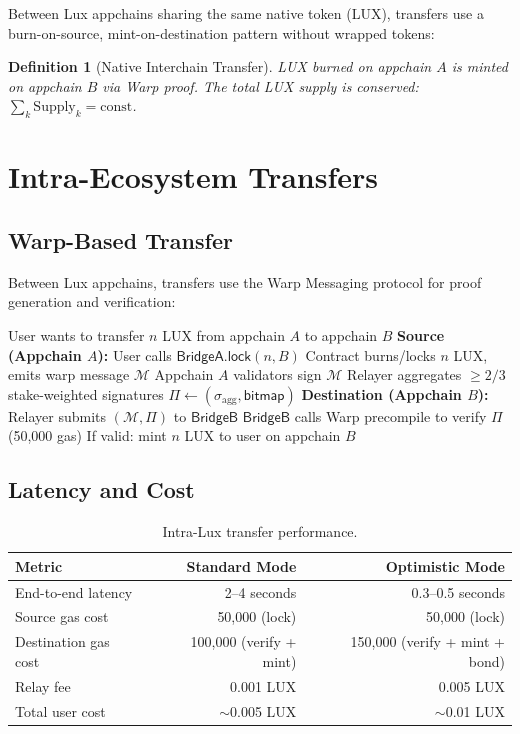 \documentclass[11pt,a4paper]{article}
\newtheorem{definition}{Definition}
\begin{document}
Between Lux appchains sharing the same native token (LUX), transfers use a burn-on-source, mint-on-destination pattern without wrapped tokens:

\begin{definition}[Native Interchain Transfer]
LUX burned on appchain $A$ is minted on appchain $B$ via Warp proof. The total LUX supply is conserved: $\sum_k \text{Supply}_k = \text{const}$.
\end{definition}

\section{Intra-Ecosystem Transfers}\label{sec:intra}

\subsection{Warp-Based Transfer}

Between Lux appchains, transfers use the Warp Messaging protocol for proof generation and verification:

\begin{algorithm}[H]
\caption{Intra-Lux Token Transfer}
\label{alg:intra}
\begin{algorithmic}[1]
\Require User wants to transfer $n$ LUX from appchain $A$ to appchain $B$
\State \textbf{Source (Appchain $A$):}
\State User calls $\mathsf{BridgeA.lock}(n, B)$
\State Contract burns/locks $n$ LUX, emits warp message $\mathcal{M}$
\State Appchain $A$ validators sign $\mathcal{M}$
\State Relayer aggregates $\geq 2/3$ stake-weighted signatures
\State $\Pi \gets (\sigma_{\text{agg}}, \mathsf{bitmap})$
\State \textbf{Destination (Appchain $B$):}
\State Relayer submits $(\mathcal{M}, \Pi)$ to $\mathsf{BridgeB}$
\State $\mathsf{BridgeB}$ calls Warp precompile to verify $\Pi$ (50,000 gas)
\State If valid: mint $n$ LUX to user on appchain $B$
\end{algorithmic}
\end{algorithm}

\subsection{Latency and Cost}

\begin{table}[H]
\centering
\caption{Intra-Lux transfer performance.}
\label{tab:intra_perf}
\begin{tabular}{lrr}
\toprule
\textbf{Metric} & \textbf{Standard Mode} & \textbf{Optimistic Mode} \\
\midrule
End-to-end latency & 2--4 seconds & 0.3--0.5 seconds \\
Source gas cost & 50,000 (lock) & 50,000 (lock) \\
Destination gas cost & 100,000 (verify + mint) & 150,000 (verify + mint + bond) \\
Relay fee & 0.001 LUX & 0.005 LUX \\
Total user cost & $\sim$0.005 LUX & $\sim$0.01 LUX \\
\bottomrule
\end{tabular}
\end{table}
\end{document}
